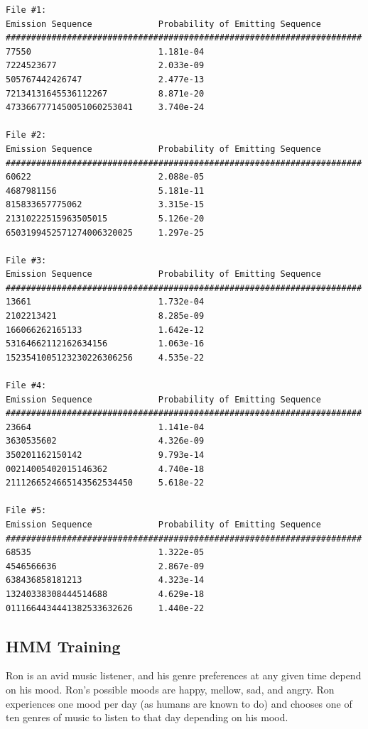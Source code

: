 \begin{solution}
\begin{verbatim}
File #1:
Emission Sequence             Probability of Emitting Sequence
######################################################################
77550                         1.181e-04 
7224523677                    2.033e-09 
505767442426747               2.477e-13 
72134131645536112267          8.871e-20 
4733667771450051060253041     3.740e-24 

File #2:
Emission Sequence             Probability of Emitting Sequence
######################################################################
60622                         2.088e-05 
4687981156                    5.181e-11 
815833657775062               3.315e-15 
21310222515963505015          5.126e-20 
6503199452571274006320025     1.297e-25 

File #3:
Emission Sequence             Probability of Emitting Sequence
######################################################################
13661                         1.732e-04 
2102213421                    8.285e-09 
166066262165133               1.642e-12 
53164662112162634156          1.063e-16 
1523541005123230226306256     4.535e-22 

File #4:
Emission Sequence             Probability of Emitting Sequence
######################################################################
23664                         1.141e-04 
3630535602                    4.326e-09 
350201162150142               9.793e-14 
00214005402015146362          4.740e-18 
2111266524665143562534450     5.618e-22 

File #5:
Emission Sequence             Probability of Emitting Sequence
######################################################################
68535                         1.322e-05 
4546566636                    2.867e-09 
638436858181213               4.323e-14 
13240338308444514688          4.629e-18 
0111664434441382533632626     1.440e-22 
  \end{verbatim}
\end{solution}

\subsection{HMM Training}
Ron is an avid music listener, and his genre preferences at any given time depend on his mood. Ron's possible moods are happy, mellow, sad, and angry. Ron experiences one mood per day (as humans are known to do) and chooses one of ten genres of music to listen to that day depending on his mood. \\

